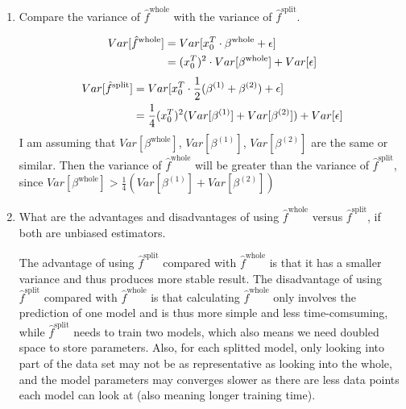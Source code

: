 \documentclass[11pt]{article}
\begin{document}
\begin{enumerate}
\item Compare the variance of $\hat{f}^{\text{whole}}$ with the variance of $\hat{f}^{\text{split}}$.\\

\begin{answertext}{8cm}{}

\begin{align}
Var[\hat{f}^{\text{whole}}] &= Var[x_{0}^{T}\cdot\beta^{\text{whole}} + \epsilon] \notag\\
&= (x_{0}^{T})^{2} \cdot Var[\beta^{\text{whole}}] + Var[\epsilon] \notag
\end{align}
\begin{align}
Var[\hat{f}^{\text{split}}] &= Var[x_{0}^{T}\cdot\frac{1}{2}(\beta^{(1)} + \beta^{(2)}) + \epsilon] \notag\\
&= \frac{1}{4}(x_{0}^{T})^{2} (Var[\beta^{(1)}] + Var[\beta^{(2)}]) + Var[\epsilon] \notag
\end{align}
I am assuming that $Var[\beta^{\text{whole}}]$, $Var[\beta^{(1)}]$, $Var[\beta^{(2)}]$ are the same or similar.
Then the variance of $\hat{f}^{\text{whole}}$ will be greater than the variance of $\hat{f}^{\text{split}}$, since 
$Var[\beta^{\text{whole}}] > \frac{1}{4}(Var[\beta^{(1)}] + Var[\beta^{(2)}])$ \\

\end{answertext} 

\pagebreak 

\item What are the advantages and disadvantages of using $\hat{f}^{\text{whole}}$ versus $\hat{f}^{\text{split}}$, if both are unbiased estimators.\\

\begin{answertext}{5cm}{}

The advantage of using $\hat{f}^{\text{split}}$ compared with $\hat{f}^{\text{whole}}$ is that it has a smaller variance and thus produces more stable result.
The disadvantage of using $\hat{f}^{\text{split}}$ compared with $\hat{f}^{\text{whole}}$ is that calculating $\hat{f}^{\text{whole}}$ only involves the prediction of one model and is thus more simple and less time-comsuming, while $\hat{f}^{\text{split}}$ needs to train two models, which also means we need doubled space to store parameters. Also, for each splitted model, only looking into part of the data set may not be as representative as looking into the whole, and the model parameters may converges slower as there are less data points each model can look at (also meaning longer training time).

\end{answertext} 
\end{enumerate}
\end{document}
